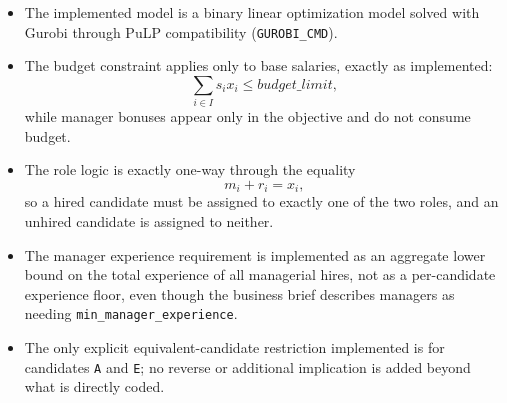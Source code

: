 \begin{itemize}
    \item The implemented model is a binary linear optimization model solved with Gurobi through PuLP compatibility (\texttt{GUROBI\_CMD}).
    \item The budget constraint applies only to base salaries, exactly as implemented:
    \[
    \sum_{i\in I} s_i x_i \le \textit{budget\_limit},
    \]
    while manager bonuses appear only in the objective and do not consume budget.
    \item The role logic is exactly one-way through the equality
    \[
    m_i + r_i = x_i,
    \]
    so a hired candidate must be assigned to exactly one of the two roles, and an unhired candidate is assigned to neither.
    \item The manager experience requirement is implemented as an aggregate lower bound on the total experience of all managerial hires, not as a per-candidate experience floor, even though the business brief describes managers as needing \texttt{min\_manager\_experience}.
    \item The only explicit equivalent-candidate restriction implemented is for candidates \texttt{A} and \texttt{E}; no reverse or additional implication is added beyond what is directly coded.
\end{itemize}
